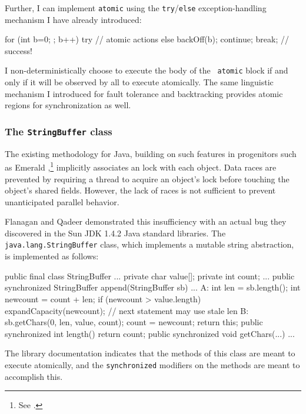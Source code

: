Further, I can implement {\tt atomic} using the {\tt try}/{\tt else}
exception-handling mechanism I have already introduced:
\begin{inlinecode}
for (int b=0; ; b++) {
  try {
    // atomic actions
  } else {
    backOff(b);
    continue;
  }
  break; // success!
}
\end{inlinecode}

I non-deterministically choose to execute the body of the {\tt
  atomic} block if and only if it will be observed by all to execute
atomically.  The same linguistic mechanism I introduced for
fault tolerance and backtracking provides atomic regions for
synchronization as well.

\subsubsection{The \texttt{StringBuffer} class}\label{sec:stringbuffer}
The existing  methodology for Java,
building on such features in progenitors such as Emerald
\cite{BlackHuJuLe86,JulSt91},\footnote{See .}
implicitly associates an 
lock with each object.
Data races are prevented by
requiring a thread to acquire an
object's lock before touching the object's shared fields.
However, the lack of races is not sufficient to prevent unanticipated
parallel behavior.

Flanagan and Qadeer \cite{FlanaganQa03} demonstrated this
insufficiency with an
actual bug they discovered in the Sun JDK 1.4.2 Java standard
libraries.  The \texttt{java.lang.StringBuffer} class,
which implements a mutable string abstraction, is implemented as follows:
\begin{inlinecode}
public final class StringBuffer ... {
  private char value[];
  private int count;
  ... 
  public synchronized
  StringBuffer append(StringBuffer sb) {
    ...
A:  int len = sb.length();
    int newcount = count + len; 
    if (newcount > value.length)
      expandCapacity(newcount);
    // next statement may use stale len
B:  sb.getChars(0, len, value, count);
    count = newcount;
    return this;
  }
  public synchronized int length() { return count; }
  public synchronized void getChars(...) { ... }
}
\end{inlinecode}

The library documentation indicates that the methods of this class are meant
to execute atomically, and the {\tt synchronized} modifiers on the
methods are meant to accomplish this.

